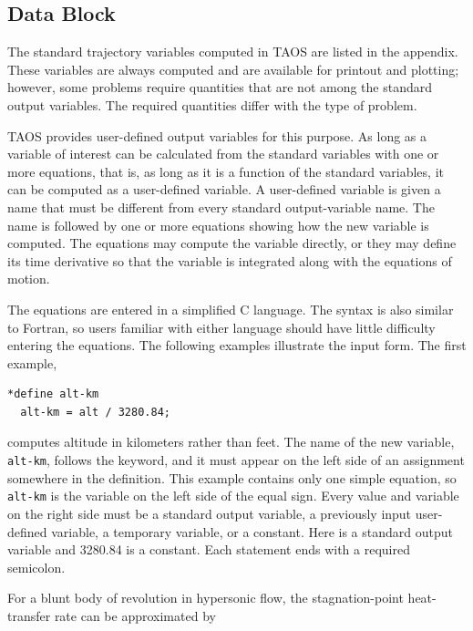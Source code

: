 \subsection{ Data Block}\label{sec:trajectory-block-define}

The standard trajectory variables computed in TAOS are listed in the appendix.
These variables are always computed and are available for printout and plotting;
however, some problems require quantities that are not among the standard output
variables. The required quantities differ with the type of problem.

TAOS provides user-defined output variables for this purpose. As long as a variable
of interest can be calculated from the standard variables with one or more equations,
that is, as long as it is a function of the standard variables, it can be computed as a
user-defined variable. A user-defined variable is given a name that must be different
from every standard output-variable name. The name is followed by one or more
equations showing how the new variable is computed. The equations may compute
the variable directly, or they may define its time derivative so that the variable is
integrated along with the equations of motion.

The equations are entered in a simplified C language. The syntax is also similar to
Fortran, so users familiar with either language should have little difficulty entering
the equations. The following examples illustrate the input form. The first example,

\begin{lstlisting}[style=taosmanual]
*define alt-km
  alt-km = alt / 3280.84;
\end{lstlisting}

computes altitude in kilometers rather than feet. The name of the new variable,
\texttt{alt-km}, follows the  keyword, and it must appear on
the left side of an assignment somewhere in the definition. This example contains
only one simple equation, so \texttt{alt-km} is the variable on the left side of the
equal sign. Every value and variable on the right side must be a standard output
variable, a previously input user-defined variable, a temporary variable, or a
constant. Here  is a standard output variable and 3280.84 is a constant.
Each statement ends with a required semicolon.


For a blunt body of revolution in hypersonic flow, the stagnation-point heat-transfer
rate can be approximated by

